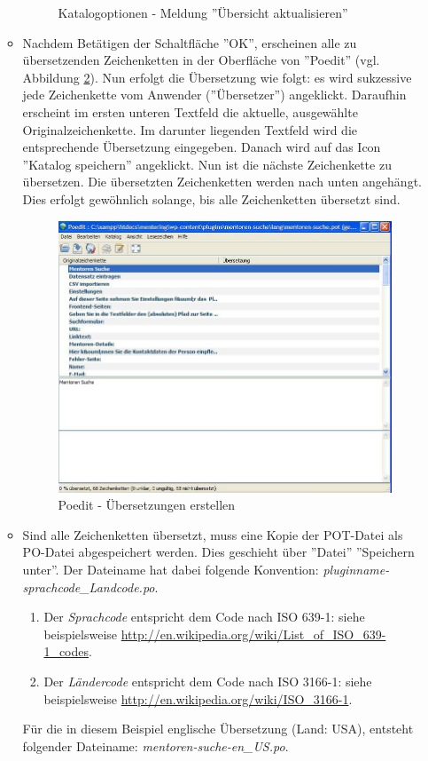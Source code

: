 \begin{enumerate}
\begin{itemize}
\begin{figure}[htbp]
\begin{center}
	    \caption{Katalogoptionen - Meldung ''Übersicht aktualisieren''}
	    \label{img:KMEUEAK}
	\end{center}
   \end{figure}   
   \newpage
   \item Nachdem Betätigen der Schaltfläche ''OK'', erscheinen alle zu übersetzenden Zeichenketten in der Oberfläche von ''Poedit'' (vgl. Abbildung \ref{img:POUEERS}).
Nun erfolgt die Übersetzung wie folgt: es wird sukzessive jede Zeichenkette vom Anwender (''Übersetzer'') angeklickt. Daraufhin erscheint im ersten unteren Textfeld die aktuelle, ausgewählte Originalzeichenkette. Im darunter liegenden Textfeld wird die entsprechende Übersetzung eingegeben. Danach wird auf das Icon ''Katalog speichern'' angeklickt. Nun ist die nächste Zeichenkette zu übersetzen. Die übersetzten Zeichenketten werden nach unten angehängt. Dies erfolgt gewöhnlich solange, bis alle Zeichenketten übersetzt sind.
     \begin{figure}[htbp]
	\begin{center}
	\includegraphics[angle={360}, scale=0.45]{pictures/lok6.jpg}
	    \caption{Poedit - Übersetzungen erstellen}
	    \label{img:POUEERS}
	\end{center}
   \end{figure} 
   \item Sind alle Zeichenketten übersetzt, muss eine Kopie der POT-Datei als PO-Datei
abgespeichert werden. Dies geschieht über ''Datei''  ''Speichern unter''.
Der Dateiname hat dabei folgende Konvention: \emph{pluginname-sprachcode\_Landcode.po}.
\begin{enumerate}
\item Der \emph{Sprachcode} entspricht dem Code nach ISO 639-1: siehe beispielsweise \url{http://en.wikipedia.org/wiki/List\_of\_ISO\_639-1\_codes}.
\item Der \emph{Ländercode} entspricht dem Code nach ISO 3166-1: siehe beispielsweise
\url{http://en.wikipedia.org/wiki/ISO\_3166-1}.
\end{enumerate}
Für die in diesem Beispiel englische Übersetzung (Land: USA), entsteht folgender Dateiname: \emph{mentoren-suche-en\_US.po}. 
\end{itemize}
\end{enumerate}
